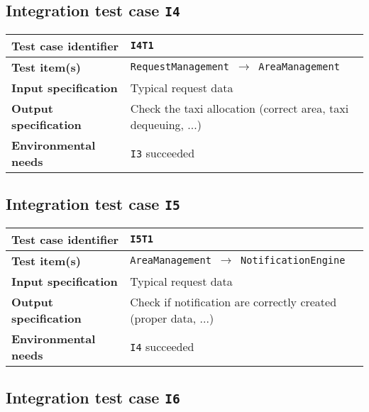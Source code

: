 \subsection*{Integration test case \normalfont\texttt{I4}}\label{subsec:t4}

\begin{table*}[!h]\centering\begin{tabularx}{.9\textwidth}{ >{\bfseries}l X }\toprule%
Test case identifier	&	\texttt{I4T1}	\\\midrule
Test item(s)		&	\texttt{RequestManagement $\to$ AreaManagement}	\\\midrule
Input specification	&	Typical request data	\\\midrule
Output specification	&	Check the taxi allocation (correct area, taxi dequeuing, ...)	\\\midrule
Environmental needs	&	\texttt{I3} succeeded	\\
\bottomrule\end{tabularx}\end{table*}









\subsection*{Integration test case \normalfont\texttt{I5}}\label{subsec:t5}

\begin{table*}[!h]\centering\begin{tabularx}{.9\textwidth}{ >{\bfseries}l X }\toprule%
Test case identifier	&	\texttt{I5T1}	\\\midrule
Test item(s)		&	\texttt{AreaManagement $\to$ NotificationEngine}	\\\midrule
Input specification	&	Typical request data	\\\midrule
Output specification	&	Check if notification are correctly created (proper data, ...)	\\\midrule
Environmental needs	&	\texttt{I4} succeeded	\\
\bottomrule\end{tabularx}\end{table*}










\subsection*{Integration test case \normalfont\texttt{I6}}\label{subsec:t6}

